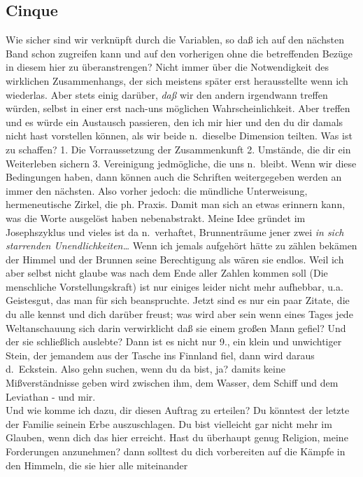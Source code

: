 \documentclass[
]{article}
\author{}
\date{\vspace{-2.5em}}
\begin{document}
\subsection{Cinque}\label{cinque}

Wie sicher sind wir verknüpft durch die Variablen, so daß ich auf den
nächsten Band schon zugreifen kann und auf den vorherigen ohne die
betreffenden Bezüge in diesem hier zu überanstrengen? Nicht immer über
die Notwendigkeit des wirklichen Zusammenhangs, der sich meistens später
erst herausstellte wenn ich wiederlas. Aber stets einig darüber,
\emph{daß} wir den andern irgendwann treffen würden, selbst in einer
erst nach-uns möglichen Wahrscheinlichkeit. Aber treffen und es würde
ein Austausch passieren, den ich mir hier und den du dir damals nicht
hast vorstellen können, als wir beide n.~dieselbe Dimension teilten. Was
ist zu schaffen? 1. Die Vorraussetzung der Zusammenkunft 2. Umstände,
die dir ein Weiterleben sichern 3. Vereinigung jedmögliche, die uns
n.~bleibt. Wenn wir diese Bedingungen haben, dann können auch die
Schriften weitergegeben werden an immer den nächsten. Also vorher
jedoch: die mündliche Unterweisung, hermeneutische Zirkel, die ph.
Praxis. Damit man sich an etwas erinnern kann, was die Worte ausgelöst
haben nebenabstrakt. Meine Idee gründet im Josephszyklus und vieles ist
da n.~verhaftet, Brunnenträume jener zwei \emph{in sich starrenden
Unendlichkeiten\ldots{}} Wenn ich jemals aufgehört hätte zu zählen
bekämen der Himmel und der Brunnen seine Berechtigung als wären sie
endlos. Weil ich aber selbst nicht glaube was nach dem Ende aller Zahlen
kommen soll (Die menschliche Vorstellungskraft) ist nur einiges leider
nicht mehr aufhebbar, u.a. Geistesgut, das man für sich beanspruchte.
Jetzt sind es nur ein paar Zitate, die du alle kennst und dich darüber
freust; was wird aber sein wenn eines Tages jede Weltanschauung sich
darin verwirklicht daß sie einem großen Mann gefiel? Und der sie
schließlich auslebte? Dann ist es nicht nur 9., ein klein und
unwichtiger Stein, der jemandem aus der Tasche ins Finnland fiel, dann
wird daraus d.~Eckstein. Also gehn suchen, wenn du da bist, ja? damits
keine Mißverständnisse geben wird zwischen ihm, dem Wasser, dem Schiff
und dem Leviathan - und mir.\\
Und wie komme ich dazu, dir diesen Auftrag zu erteilen? Du könntest der
letzte der Familie seinein Erbe auszuschlagen. Du bist vielleicht gar
nicht mehr im Glauben, wenn dich das hier erreicht. Hast du überhaupt
genug Religion, meine Forderungen anzunehmen? dann solltest du dich
vorbereiten auf die Kämpfe in den Himmeln, die sie hier alle miteinander
\end{document}

